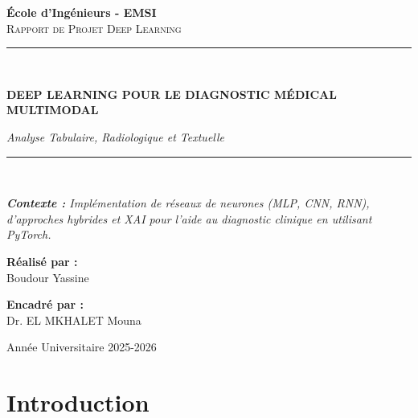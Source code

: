 \documentclass[a4paper,12pt]{report}
\begin{document}
\begin{titlepage}
    \centering
    
    {\LARGE \textbf{École d'Ingénieurs - EMSI}} \\[0.5cm]
    \textsc{\Large Rapport de Projet Deep Learning}\\[0.2cm]
    \rule{\linewidth}{0.5mm} \\[1cm]

    {\huge \bfseries DEEP LEARNING POUR LE DIAGNOSTIC MÉDICAL \\[0.3cm] MULTIMODAL \par}
    
    \vspace{0.5cm}
    {\Large \textit{Analyse Tabulaire, Radiologique et Textuelle}} \\[1cm]
    \rule{\linewidth}{0.5mm} \\[1.5cm]

    \begin{minipage}{0.8\textwidth}
        \centering
        \textit{\textbf{Contexte :} Implémentation de réseaux de neurones (MLP, CNN, RNN), d'approches hybrides et XAI pour l'aide au diagnostic clinique en utilisant PyTorch.}
    \end{minipage}
    
    \vspace{2cm}

    \begin{minipage}{0.45\textwidth}
        \begin{flushleft} \large
            \textbf{Réalisé par :}\\
            Boudour Yassine
        \end{flushleft}
    \end{minipage}
    \hfill
    \begin{minipage}{0.45\textwidth}
        \begin{flushright} \large
            \textbf{Encadré par :}\\
            Dr. EL MKHALET Mouna
        \end{flushright}
    \end{minipage}

    \vfill
    {\large Année Universitaire 2025-2026}
\end{titlepage}

\tableofcontents
\newpage

\chapter*{Introduction}
\end{document}
